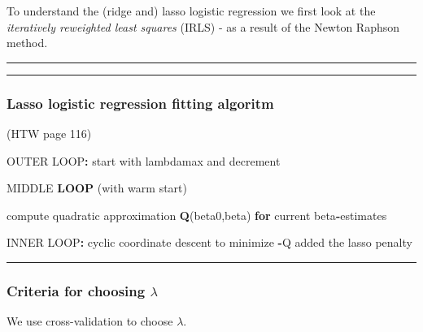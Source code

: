 \documentclass[
]{article}
\newenvironment{Shaded}{\begin{snugshade}}{\end{snugshade}}
\newcommand{\ControlFlowTok}[1]{\textcolor[rgb]{0.13,0.29,0.53}{\textbf{#1}}}
\newcommand{\KeywordTok}[1]{\textcolor[rgb]{0.13,0.29,0.53}{\textbf{#1}}}
\newcommand{\NormalTok}[1]{#1}
\newcommand{\OperatorTok}[1]{\textcolor[rgb]{0.81,0.36,0.00}{\textbf{#1}}}
\newcommand{\StringTok}[1]{\textcolor[rgb]{0.31,0.60,0.02}{#1}}
\begin{document}
To understand the (ridge and) lasso logistic regression we first look at
the \emph{iteratively reweighted least squares} (IRLS) - as a result of
the Newton Raphson method.

\begin{center}\rule{0.5\linewidth}{0.5pt}\end{center}

\begin{center}\rule{0.5\linewidth}{0.5pt}\end{center}

\hypertarget{lasso-logistic-regression-fitting-algoritm}{%
\subsubsection{Lasso logistic regression fitting
algoritm}\label{lasso-logistic-regression-fitting-algoritm}}

(HTW page 116)

\begin{Shaded}
\begin{Highlighting}[]
\NormalTok{OUTER LOOP}\OperatorTok{:}\StringTok{ }\NormalTok{start with lambdamax and decrement}

\NormalTok{      MIDDLE }\KeywordTok{LOOP}\NormalTok{ (with warm start) }
         
\NormalTok{         compute quadratic approximation }\KeywordTok{Q}\NormalTok{(beta0,beta) }
         \ControlFlowTok{for}\NormalTok{ current beta}\OperatorTok{-}\NormalTok{estimates}
         
         
         
\NormalTok{              INNER LOOP}\OperatorTok{:}\StringTok{ }\NormalTok{cyclic coordinate descent}
\NormalTok{              to minimize }\OperatorTok{-}\NormalTok{Q added the lasso penalty}
\end{Highlighting}
\end{Shaded}

\begin{center}\rule{0.5\linewidth}{0.5pt}\end{center}

\hypertarget{criteria-for-choosing-lambda}{%
\subsubsection{\texorpdfstring{Criteria for choosing
\(\lambda\)}{Criteria for choosing \textbackslash lambda}}\label{criteria-for-choosing-lambda}}

We use cross-validation to choose \(\lambda\).
\end{document}
